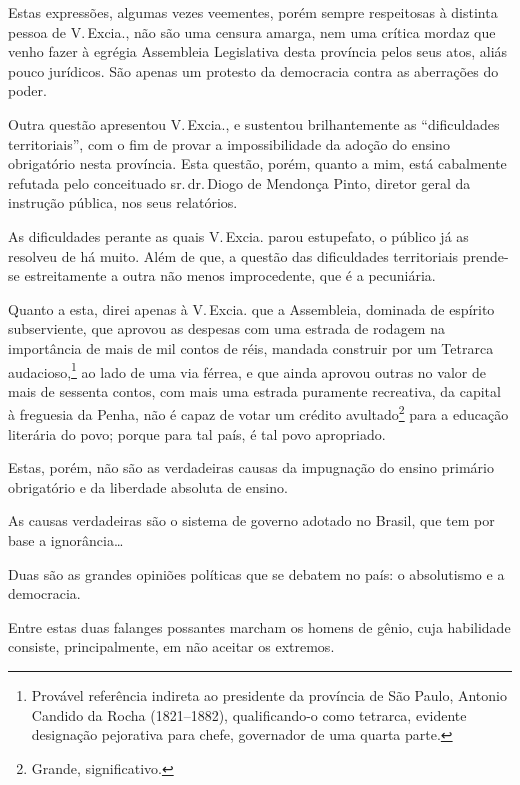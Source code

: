 Estas expressões, algumas vezes veementes, porém sempre respeitosas à
distinta pessoa de V.\,Excia., não são uma censura amarga, nem uma
crítica mordaz que venho fazer à egrégia Assembleia Legislativa desta
província pelos seus atos, aliás pouco jurídicos. São apenas um protesto
da democracia contra as aberrações do poder.

Outra questão apresentou V.\,Excia., e sustentou brilhantemente as
``dificuldades territoriais'', com o fim de provar a impossibilidade da
adoção do ensino obrigatório nesta província. Esta questão, porém,
quanto a mim, está cabalmente refutada pelo conceituado sr.\,dr.\,Diogo de
Mendonça Pinto, diretor geral da instrução pública, nos seus relatórios.

As dificuldades perante as quais V.\,Excia. parou estupefato, o público
já as resolveu de há muito. Além de que, a questão das dificuldades
territoriais prende-se estreitamente a outra não menos improcedente, que
é a pecuniária.

Quanto a esta, direi apenas à V.\,Excia. que a Assembleia, dominada de
espírito subserviente, que aprovou as despesas com uma estrada de
rodagem na importância de mais de mil contos de réis, mandada construir
por um Tetrarca audacioso,\footnote{Provável referência indireta ao
  presidente da província de São Paulo, Antonio Candido da Rocha
  (1821--1882), qualificando-o como tetrarca, evidente designação
  pejorativa para chefe, governador de uma quarta parte.} ao lado de
uma via férrea, e que ainda aprovou outras no valor de mais de sessenta
contos, com mais uma estrada puramente recreativa, da capital à
freguesia da Penha, não é capaz de votar um crédito avultado\footnote{
  Grande, significativo.} para a educação literária do povo; porque para
tal país, é tal povo apropriado.

Estas, porém, não são as verdadeiras causas da impugnação do ensino
primário obrigatório e da liberdade absoluta de ensino.

As causas verdadeiras são o sistema de governo adotado no Brasil, que
tem por base a ignorância\ldots

Duas são as grandes opiniões políticas que se debatem no país: o
absolutismo e a democracia.

Entre estas duas falanges possantes marcham os homens de gênio, cuja
habilidade consiste, principalmente, em não aceitar os extremos.

